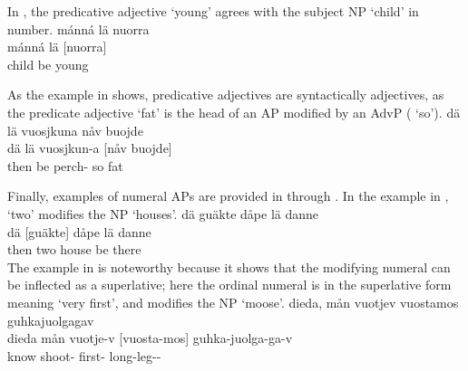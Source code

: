 In , the predicative adjective  ‘young’ agrees with the subject NP  ‘child’ in number. 
\ea\label{APstructureEx3}%
\glll	mánná lä nuorra\\
	mánná lä {[nuorra]\subAP}\\
	child\BS{} be\BS{} young\BS{}\\\nopagebreak
{}	
\z

As the example in  shows, predicative adjectives are syntactically adjectives, as the predicate adjective  ‘fat’ is the head of an AP modified by an AdvP ( ‘so’). %
\ea\label{APstructureEx4}%
\glll	dä lä vuosjkuna nåv buojde\\
	dä lä vuosjkun-a [nåv {buojde]\subAP}\\
	then be\BS{} perch- so fat\BS{}\\\nopagebreak
{}	
\z


Finally, examples of numeral APs are provided in  through . In the example in ,  ‘two’ modifies the NP  ‘houses’. %
\ea\label{APstructureEx5}%
\glll	dä guäkte dåpe lä danne\\
	dä {[guäkte]\subAP} dåpe lä danne \\
	then two house\BS{} be\BS{} there\\\nopagebreak
{}	
\z
The example in  %
is noteworthy because it shows that the modifying numeral can be inflected as a superlative; here the ordinal numeral  is in the superlative form  meaning ‘very first’, and modifies the NP  ‘moose’. 
\ea\label{APstructureEx6}%
\glll	dieda, mån vuotjev vuostamos guhkajuolgagav\\
	dieda mån vuotje-v {[vuosta-mos]\subAP} guhka-juolga-ga-v\\
	know\BS{}  shoot- first- long-leg--\\\nopagebreak
{}	%
\z

